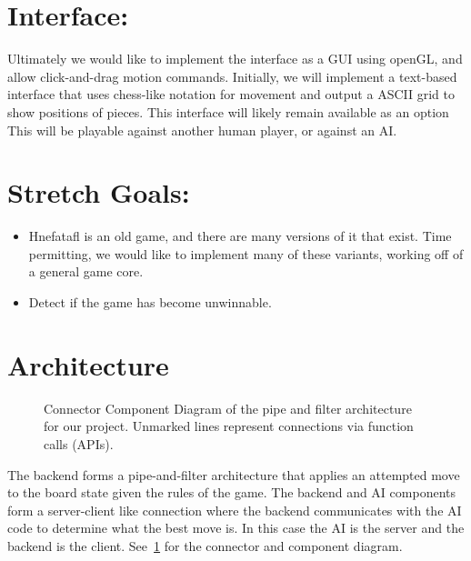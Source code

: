 \documentclass[11pt, oneside]{article}
\begin{document}
\section{Interface:}
Ultimately we would like to implement the interface as a GUI using openGL, and
allow click-and-drag motion commands. Initially, we will implement a text-based
interface that uses chess-like notation for movement and output a ASCII grid to
show positions of pieces. This interface will likely remain available as an
option\\
This will be playable against another human player, or against an AI.

\section{Stretch Goals:}
\begin{itemize}
\item Hnefatafl is an old game, and there are many versions of it that exist.
  Time permitting, we would like to implement many of these variants, working
  off of a general game core.
\item Detect if the game has become unwinnable.
\end{itemize}

\section{Architecture}
\begin{figure}[H]\label{fig:CCD}
  \centering
  \caption{Connector Component Diagram of the pipe and filter architecture for
    our project. Unmarked lines represent connections via function calls
    (APIs).}
\end{figure}
The backend forms a pipe-and-filter architecture that applies an attempted move
to the board state given the rules of the game. The backend and AI components
form a server-client like connection where the backend communicates with the AI
code to determine what the best move is. In this case the AI is the server and
the backend is the client. See~\ref{fig:CCD} for the connector and component
diagram.
\end{document}
